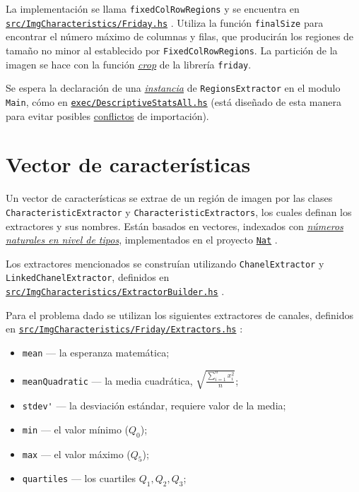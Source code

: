 \documentclass{article}
\newcommand\refcode[2]{ \href{#1}{\texttt{#2}} }
\begin{document}
La implementación se llama \verb|fixedColRowRegions| y se encuentra en\\ \refcode{\Friday}{src/ImgCharacteristics/Friday.hs}. Utiliza la función \verb|finalSize| para encontrar el número máximo de columnas y filas, que producirán los regiones de tamaño no minor al establecido por \verb|FixedColRowRegions|. La partición de la imagen se hace con la función \href{https://hackage.haskell.org/package/friday-0.2.2.0/docs/Vision-Image-Transform.html}{\emph{crop}} de la librería \verb|friday|.

Se espera la declaración de una \href{https://downloads.haskell.org/~ghc/7.0.1/docs/html/users_guide/type-class-extensions.html}{\emph{instancia}} de \verb|RegionsExtractor| en el modulo \verb|Main|, cómo en \refcode{\ExecAll}{exec/DescriptiveStatsAll.hs} (está diseñado de esta manera para evitar posibles \href{https://wiki.haskell.org/Multiple_instances}{conflictos} de importación).

\section{Vector de características}

Un vector de características se extrae de un región de imagen por las clases \verb|CharacteristicExtractor| y \verb|CharacteristicExtractors|, los cuales definan los extractores y sus nombres. Están basados en vectores, indexados con \href{https://wiki.haskell.org/Type_arithmetic}{\emph{números naturales en nivel de tipos}}, implementados en el proyecto \refcode{\Nat}{Nat}.

Los extractores mencionados se construían utilizando \verb|ChanelExtractor| y \verb|LinkedChanelExtractor|, definidos en \\ \refcode{\ExtractorBuilder}{src/ImgCharacteristics/ExtractorBuilder.hs}.


Para el problema dado se utilizan los siguientes extractores de canales, definidos en \refcode{\Extractors}{src/ImgCharacteristics/Friday/Extractors.hs}:
\begin{itemize}
\item \verb|mean| --- la esperanza matemática;
\item \verb|meanQuadratic| --- la media cuadrática, $\sqrt{\frac{\sum\limits_{i=1}^n x_i^2}{n}}$;
\item \verb|stdev'| --- la desviación estándar, requiere valor de la media;
\item \verb|min| --- el valor mínimo ($Q_0$);
\item \verb|max| --- el valor máximo ($Q_5$);
\item \verb|quartiles| --- los cuartiles $Q_1, Q_2, Q_3$;
\end{itemize}
\end{document}
